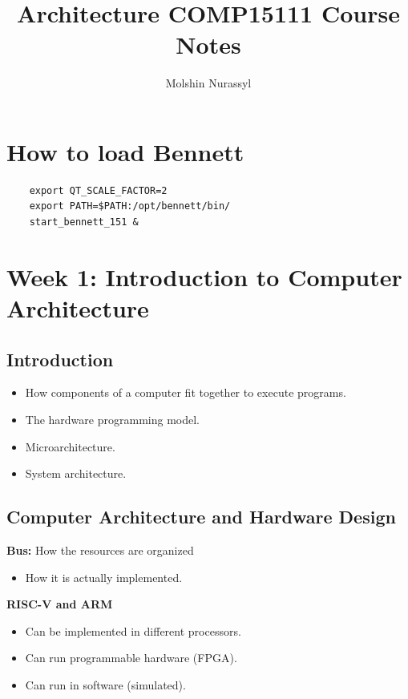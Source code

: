 \documentclass{article}
\title{Architecture COMP15111 Course Notes}
\author{Molshin Nurassyl}
\date{}
\begin{document}
\maketitle

\tableofcontents

\newpage
\section*{How to load Bennett}
\begin{verbatim}
    export QT_SCALE_FACTOR=2
    export PATH=$PATH:/opt/bennett/bin/
    start_bennett_151 &
\end{verbatim}

\section*{Week 1: Introduction to Computer Architecture}

\subsection*{Introduction}
\begin{itemize}
    \item How components of a computer fit together to execute programs.
    \item The hardware programming model.
    \item Microarchitecture.
    \item System architecture.
\end{itemize}

\subsection*{Computer Architecture and Hardware Design}
\textbf{Bus:} How the resources are organized
\begin{itemize}
    \item How it is actually implemented.
\end{itemize}

\textbf{RISC-V and ARM}
\begin{itemize}
    \item Can be implemented in different processors.
    \item Can run programmable hardware (FPGA).
    \item Can run in software (simulated).
\end{itemize}
\end{document}

